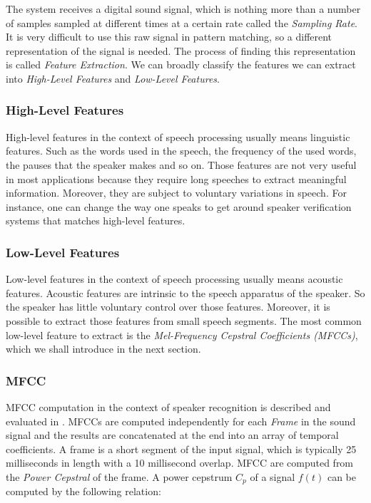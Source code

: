 \documentclass[twocolumn]{article}
\begin{document}
The system receives a digital sound signal, which is nothing more than a number
of samples sampled at different times at a certain rate called the
\emph{Sampling Rate}. It is very difficult to use this raw signal in pattern
matching, so a different representation of the signal is needed. The process of
finding this representation is called \emph{Feature Extraction}. We can broadly
classify the features we can extract into \emph{High-Level Features} and
\emph{Low-Level Features}.

\subsubsection{High-Level Features}

High-level features in the context of speech processing usually means
linguistic features. Such as the words used in the speech, the frequency of the
used words, the pauses that the speaker makes and so on. Those features are not
very useful in most applications because they require long speeches to extract
meaningful information. Moreover, they are subject to voluntary variations in
speech. For instance, one can change the way one speaks to get around speaker
verification systems that matches high-level features.

\subsubsection{Low-Level Features}

Low-level features in the context of speech processing usually means acoustic
features. Acoustic features are intrinsic to the speech apparatus of the
speaker. So the speaker has little voluntary control over those features.
Moreover, it is possible to extract those features from small speech segments.
The most common low-level feature to extract is the \emph{Mel-Frequency
Cepstral Coefficients (MFCCs)}, which we shall introduce in the next section.

\subsubsection{MFCC}

MFCC computation in the context of speaker recognition is described and
evaluated in \autocite{Sahidullah2012}. MFCCs are computed independently for
each \emph{Frame} in the sound signal and the results are  concatenated at the
end into an array of temporal coefficients. A frame is a short segment of the
input signal, which is typically 25 milliseconds in length with a 10
millisecond overlap. MFCC are computed from the \emph{Power Cepstral} of the
frame. A power cepstrum $C_{p}$ of a signal $f(t)$ can be computed by the
following relation:
\end{document}
